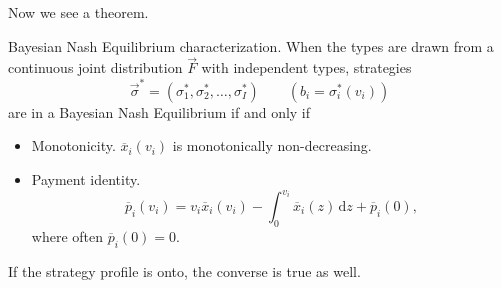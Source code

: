 Now we see a theorem.
\begin{theorem}
	Bayesian Nash Equilibrium characterization. When the types are drawn from a continuous joint distribution \(\vec{F}\) with independent types,
	strategies
	\[
		\vec{\sigma}^{\ast} = (\sigma^{\ast}_1, \sigma^{\ast}_2, \ldots , \sigma^{\ast}_I)\qquad (b_{i} = \sigma^{\ast}_{i}(v_{i}))
	\]
	are in a Bayesian Nash Equilibrium if and only if
	\begin{itemize}
		\item Monotonicity. \(\overline{x}_{i}(v_{i})\) is monotonically non-decreasing.
		\item Payment identity.
		      \[
			      \overline{p}_{i}(v_{i}) = v_{i}\overline{x}_{i}(v_{i}) - \int_0^{v_{i}} \overline{x}_{i}(z)\,\mathrm{d}z + \overline{p}_{i}(0),
		      \]
		      where often \(\overline{p}_{i}(0) = 0\).
	\end{itemize}
	If the strategy profile is onto, the converse is true as well.
\end{theorem}